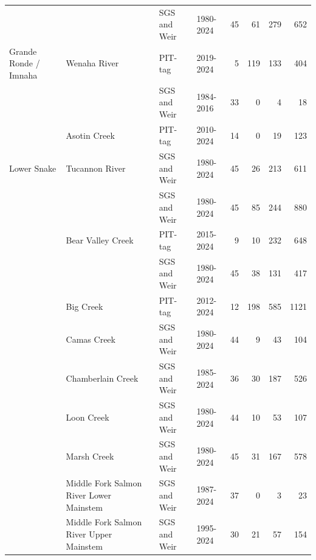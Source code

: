 \documentclass[12pt,a4paper]{article}
\begin{document}
\begin{table}
\begin{tabular}[t]{llllrrrr}
 &  & SGS and Weir & 1980-2024 & 45 & 61 & 279 & 652\\

\multirow[t]{-12}{*}[7\dimexpr\aboverulesep+\belowrulesep+\cmidrulewidth]{\raggedright\arraybackslash Grande Ronde / Imnaha} & \multirow[t]{-2}{*}{\raggedright\arraybackslash Wenaha River} & PIT-tag & 2019-2024 & 5 & 119 & 133 & 404\\

 &  & SGS and Weir & 1984-2016 & 33 & 0 & 4 & 18\\

 & \multirow[t]{-2}{*}{\raggedright\arraybackslash Asotin Creek} & PIT-tag & 2010-2024 & 14 & 0 & 19 & 123\\

\multirow[t]{-3}{*}[1\dimexpr\aboverulesep+\belowrulesep+\cmidrulewidth]{\raggedright\arraybackslash Lower Snake} & Tucannon River & SGS and Weir & 1980-2024 & 45 & 26 & 213 & 611\\

 &  & SGS and Weir & 1980-2024 & 45 & 85 & 244 & 880\\

 & \multirow[t]{-2}{*}{\raggedright\arraybackslash Bear Valley Creek} & PIT-tag & 2015-2024 & 9 & 10 & 232 & 648\\

 &  & SGS and Weir & 1980-2024 & 45 & 38 & 131 & 417\\

 & \multirow[t]{-2}{*}{\raggedright\arraybackslash Big Creek} & PIT-tag & 2012-2024 & 12 & 198 & 585 & 1121\\

 & Camas Creek & SGS and Weir & 1980-2024 & 44 & 9 & 43 & 104\\

 & Chamberlain Creek & SGS and Weir & 1985-2024 & 36 & 30 & 187 & 526\\

 & Loon Creek & SGS and Weir & 1980-2024 & 44 & 10 & 53 & 107\\

 & Marsh Creek & SGS and Weir & 1980-2024 & 45 & 31 & 167 & 578\\

 & Middle Fork Salmon River Lower Mainstem & SGS and Weir & 1987-2024 & 37 & 0 & 3 & 23\\

 & Middle Fork Salmon River Upper Mainstem & SGS and Weir & 1995-2024 & 30 & 21 & 57 & 154\\


\end{tabular}
\end{table}
\end{document}
